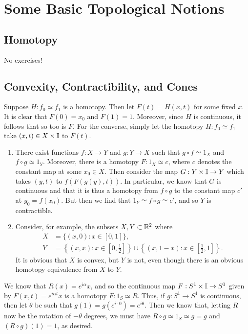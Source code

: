 \documentclass[../solutions.tex]{subfiles}
\begin{document}
\section{Some Basic Topological Notions} 
\subsection{Homotopy} 
No exercises! 

\subsection{Convexity, Contractibility, and Cones} 
\begin{exercise} \leavevmode
Suppose $H:f_0\simeq f_1$ is a homotopy. Then let $F(t)=H(x,t)$ for some fixed $x$. It is clear that $F(0)=x_0$ and $F(1)=1$. Moreover, since $H$ is continuous, it follows that so too is $F$. For the converse, simply let the homotopy $H:f_0\simeq f_1$ take $(x,t)\in X\times\mathbb I$ to $F(t)$. 
\end{exercise} 

\begin{exercise} \leavevmode
\begin{enumerate}
\item There exist functions $f:X\to Y$ and $g:Y\to X$ such that $g\circ f\simeq1_X$ and $f\circ g\simeq1_Y$. Moreover, there is a homotopy $F:1_X\simeq c$, where $c$ denotes the constant map at some $x_0\in X$. Then consider the map $G:Y\times\mathbb I\to Y$ which takes $(y,t)$ to $f(F(g(y),t))$. In particular, we know that $G$ is continuous and that it is thus a homotopy from $f\circ g$ to the constant map $c'$ at $y_0=f(x_0)$. But then we find that $1_Y\simeq f\circ g\simeq c'$, and so $Y$ is contractible. 

\item Consider, for example, the subsets $X,Y\subset\mathbb{R}^2$ where \begin{align*}X&=\{(x,0):x\in[0,1]\},\\Y&=\left\{(x,x):x\in\left[0,\frac12\right]\right\}\cup\left\{(x,1-x):x\in\left[\frac12,1\right]\right\}.\end{align*} It is obvious that $X$ is convex, but $Y$ is not, even though there is an obvious homotopy equivalence from $X$ to $Y$. 
\end{enumerate}
\end{exercise} 

\begin{exercise} \leavevmode
We know that $R(x)=e^{i\alpha}x$, and so the continuous map $F:S^1\times\mathbb I\to S^1$ given by $F(x,t)=e^{i\alpha t}x$ is a homotopy $F:1_S\simeq R$. Thus, if $g:S^1\to S^1$ is continuous, then let $\theta$ be such that $g(1)=g(e^{i\cdot0})=e^{i\theta}$. Then we know that, letting $R$ now be the rotation of $-\theta$ degrees, we must have $R\circ g\simeq 1_S\simeq g=g$ and $(R\circ g)(1)=1$, as desired. 
\end{exercise} 
\end{document}
